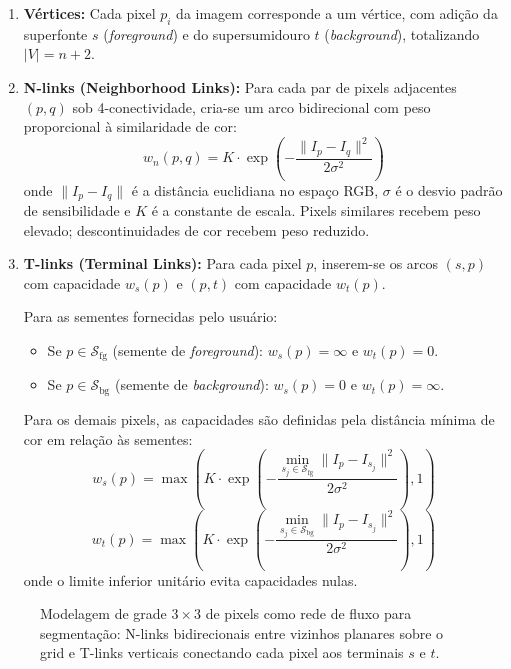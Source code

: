 \begin{enumerate}
    \item \textbf{Vértices:} Cada pixel $p_i$ da imagem corresponde a um vértice, com adição da superfonte $s$ (\textit{foreground}) e do supersumidouro $t$ (\textit{background}), totalizando $|V| = n + 2$.

    \item \textbf{N-links (Neighborhood Links):} Para cada par de pixels adjacentes $(p, q)$ sob 4-conectividade, cria-se um arco bidirecional com peso proporcional à similaridade de cor:
    \begin{equation}
        w_{n}(p, q) = K \cdot \exp\left(-\frac{\|I_p - I_q\|^2}{2\sigma^2}\right)
    \end{equation}
    onde $\|I_p - I_q\|$ é a distância euclidiana no espaço RGB, $\sigma$ é o desvio padrão de sensibilidade e $K$ é a constante de escala. Pixels similares recebem peso elevado; descontinuidades de cor recebem peso reduzido.

    \item \textbf{T-links (Terminal Links):} Para cada pixel $p$, inserem-se os arcos $(s, p)$ com capacidade $w_s(p)$ e $(p, t)$ com capacidade $w_t(p)$.

    Para as sementes fornecidas pelo usuário:
    \begin{itemize}
        \item Se $p \in \mathcal{S}_{\text{fg}}$ (semente de \textit{foreground}): $w_s(p) = \infty$ e $w_t(p) = 0$.
        \item Se $p \in \mathcal{S}_{\text{bg}}$ (semente de \textit{background}): $w_s(p) = 0$ e $w_t(p) = \infty$.
    \end{itemize}

    Para os demais pixels, as capacidades são definidas pela distância mínima de cor em relação às sementes:
    \begin{equation}
        w_s(p) = \max\left( K \cdot \exp\left(-\frac{\min_{s_j \in \mathcal{S}_{\text{fg}}} \|I_p - I_{s_j}\|^2}{2\sigma^2}\right), 1 \right)
    \end{equation}
    \begin{equation}
        w_t(p) = \max\left( K \cdot \exp\left(-\frac{\min_{s_j \in \mathcal{S}_{\text{bg}}} \|I_p - I_{s_j}\|^2}{2\sigma^2}\right), 1 \right)
    \end{equation}
    onde o limite inferior unitário evita capacidades nulas.
\end{enumerate}

\begin{figure}[!ht]
\centering

\caption{Modelagem de grade $3 \times 3$ de pixels como rede de fluxo para segmentação: N-links bidirecionais entre vizinhos planares sobre o grid e T-links verticais conectando cada pixel aos terminais $s$ e $t$.}
\label{fig:segmentacao_grafo}
\end{figure}


